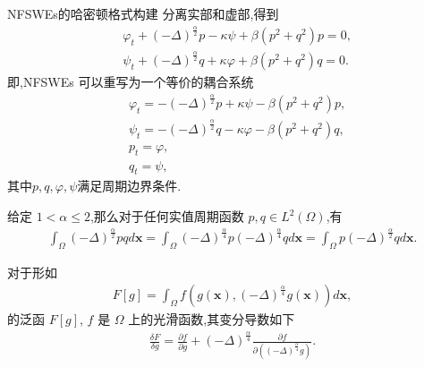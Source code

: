 \documentclass[aspectratio=169]{beamer}
\numberwithin{theorem}{section} %
\numberwithin{equation}{section}%
\numberwithin{figure}{section}%
\numberwithin{table}{section}%
\begin{document}
	\begin{frame}{NFSWEs的哈密顿格式构建}
		分离实部和虚部,得到
		\begin{align}
		&\varphi_{t}+\left( -\Delta \right) ^{\frac{\alpha }{2}}p-\kappa \psi+\beta \left( p^{2}+q^{2}\right)p=0,\nonumber\\
		&\psi_{t}+\left( -\Delta \right) ^{\frac{\alpha }{2}}q+\kappa \varphi+\beta \left( p^{2}+q^{2}\right)q=0.\label{eq_PAVF:29}
		\end{align}
		即,NFSWEs  可以重写为一个等价的耦合系统
		{\color{purple}\begin{align}
		&\varphi_{t}=-\left( -\Delta \right) ^{\frac{\alpha }{2}}p+\kappa \psi-\beta \left( p^{2}+q^{2}\right)p\label{eq_PAVF:30},\\
		&\psi_{t}=-\left( -\Delta \right) ^{\frac{\alpha }{2}}q-\kappa \varphi-\beta \left( p^{2}+q^{2}\right)q\label{eq_PAVF:31},\\
		&p_t=\varphi, \label{eq_PAVF:32}\\
		&q_t=\psi, \label{eq_PAVF:33}
		\end{align}}
		其中$p, q,\varphi,\psi$满足周期边界条件.
	\end{frame}
\begin{frame}%
	\begin{lemma}\label{lem_PAVF:1}
		\cite{fuStructurepreservingAlgorithmsTwodimensional2020} 
		 给定 $1<\alpha \leq 2$,那么对于任何实值周期函数 $p, q \in L^{2}(\Omega)$,有
		\begin{align}\label{eq_PAVF:22}
		\int_{\Omega}(-\Delta)^{\frac{\alpha}{2}} p q d \boldsymbol{x}=\int_{\Omega}(-\Delta)^{\frac{\alpha}{4}} p(-\Delta)^{\frac{\alpha}{4}} q d \boldsymbol{x}=\int_{\Omega} p(-\Delta)^{\frac{\alpha}{2}} q d \boldsymbol{x}.
		\end{align}
		\end{lemma}
		
\begin{lemma}\label{lem_PAVF:2}
	\cite{wangStructurepreservingNumericalMethods2018} 
	 对于形如
	\begin{align}\label{eq_PAVF:25}
	F[g]=\int_{\Omega} f\left(g(\boldsymbol{x}),(-\Delta)^{\frac{\alpha}{4}} g(\boldsymbol{x})\right) d \boldsymbol{x},
	\end{align}
	的泛函 $F[g]$, $f$ 是 $\Omega$ 上的光滑函数,其变分导数如下
	\begin{align}\label{eq_PAVF:26}
	\frac{\delta F}{\delta g}=\frac{\partial f}{\partial g}+(-\Delta)^{\frac{\alpha}{4}} \frac{\partial f}{\partial\left((-\Delta)^{\frac{\alpha}{4}} g\right)} .
	\end{align}
	\end{lemma}
	\end{frame}
\end{document}
